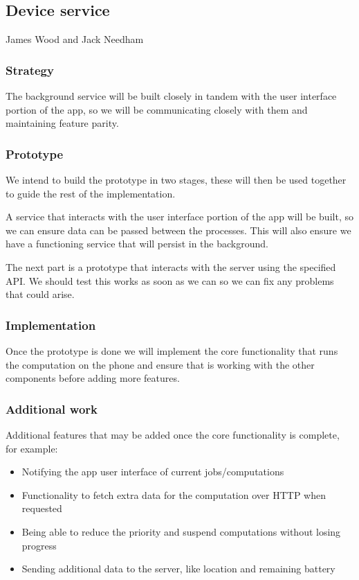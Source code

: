\documentclass[
  twoside,
  10pt, a4paper
]{article}
\begin{document}
\newpage
\subsection{Device service}

James Wood and Jack Needham

\subsubsection{Strategy}

The background service will be built closely in tandem with the user interface portion of the app, so we will be communicating closely with them and maintaining feature parity.

\subsubsection{Prototype}

We intend to build the prototype in two stages, these will then be used together to guide the rest of the implementation.

A service that interacts with the user interface portion of the app will be built, so we can ensure data can be passed between the processes.
This will also ensure we have a functioning service that will persist in the background.

The next part is a prototype that interacts with the server using the specified API. We should test this works as soon as we can so we can fix any problems that could arise.

\subsubsection{Implementation}

Once the prototype is done we will implement the core functionality that runs the computation on the phone and ensure that is working with the other components before adding more features.

\subsubsection{Additional work}
Additional features that may be added once the core functionality is complete, for example:
\begin{itemize}
\item Notifying the app user interface of current jobs/computations
\item Functionality to fetch extra data for the computation over HTTP when requested
\item Being able to reduce the priority and suspend computations without losing progress
\item Sending additional data to the server, like location and remaining battery
\end{itemize}
\end{document}
